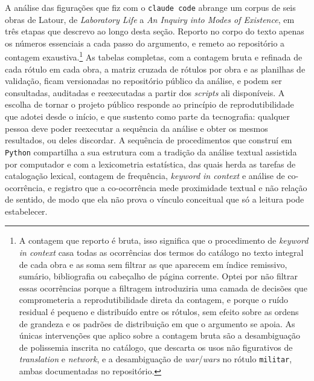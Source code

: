 A análise das figurações que fiz com o \texttt{claude code} abrange um corpus de seis obras de Latour, de \emph{Laboratory Life} a \emph{An Inquiry into Modes of Existence}, em três etapas que descrevo ao longo desta seção. Reporto no corpo do texto apenas os números essenciais a cada passo do argumento, e remeto ao repositório a contagem exaustiva.\footnote{A contagem que reporto é bruta, isso significa que o procedimento de \emph{keyword in context} casa todas as ocorrências dos termos do catálogo no texto integral de cada obra e as soma sem filtrar as que aparecem em índice remissivo, sumário, bibliografia ou cabeçalho de página corrente. Optei por não filtrar essas ocorrências porque a filtragem introduziria uma camada de decisões que comprometeria a reprodutibilidade direta da contagem, e porque o ruído residual é pequeno e distribuído entre os rótulos, sem efeito sobre as ordens de grandeza e os padrões de distribuição em que o argumento se apoia. As únicas intervenções que aplico sobre a contagem bruta são a desambiguação de polissemia inscrita no catálogo, que descarta os usos não figurativos de \emph{translation} e \emph{network}, e a desambiguação de \emph{war}/\emph{wars} no rótulo \texttt{militar}, ambas documentadas no repositório.} As tabelas completas, com a contagem bruta e refinada de cada rótulo em cada obra, a matriz cruzada de rótulos por obra e as planilhas de validação, ficam versionadas no repositório público da análise, e podem ser consultadas, auditadas e reexecutadas a partir dos \emph{scripts} ali disponíveis. A escolha de tornar o projeto público responde ao princípio de reprodutibilidade que adotei desde o início, e que sustento como parte da tecnografia: qualquer pessoa deve poder reexecutar a sequência da análise e obter os mesmos resultados, ou deles discordar. A sequência de procedimentos que construí em \texttt{Python} compartilha a sua estrutura com a tradição da análise textual assistida por computador e com a lexicometria estatística, das quais herda as tarefas de catalogação lexical, contagem de frequência, \emph{keyword in context} e análise de co-ocorrência, e registro que a co-ocorrência mede proximidade textual e não relação de sentido, de modo que ela não prova o vínculo conceitual que só a leitura pode estabelecer.

